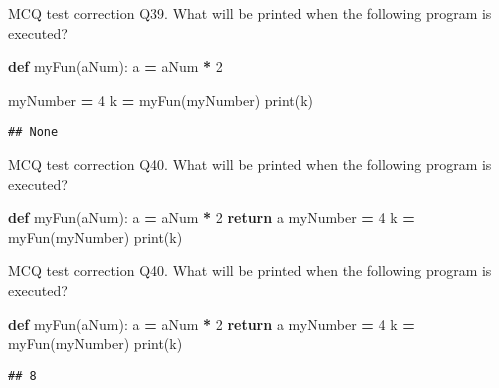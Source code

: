 \documentclass[
  8pt,
  ignorenonframetext,
]{beamer}
\newenvironment{Shaded}{\begin{snugshade}}{\end{snugshade}}
\newcommand{\BuiltInTok}[1]{#1}
\newcommand{\ControlFlowTok}[1]{\textcolor[rgb]{0.13,0.29,0.53}{\textbf{#1}}}
\newcommand{\DecValTok}[1]{\textcolor[rgb]{0.00,0.00,0.81}{#1}}
\newcommand{\KeywordTok}[1]{\textcolor[rgb]{0.13,0.29,0.53}{\textbf{#1}}}
\newcommand{\NormalTok}[1]{#1}
\newcommand{\OperatorTok}[1]{\textcolor[rgb]{0.81,0.36,0.00}{\textbf{#1}}}
\begin{document}
\begin{frame}[fragile]{MCQ test correction}
\protect\hypertarget{mcq-test-correction-77}{}
Q39. What will be printed when the following program is executed?

\begin{Shaded}
\begin{Highlighting}[]
\KeywordTok{def}\NormalTok{ myFun(aNum):}
\NormalTok{    a }\OperatorTok{=}\NormalTok{ aNum }\OperatorTok{*} \DecValTok{2}

\NormalTok{myNumber }\OperatorTok{=} \DecValTok{4}
\NormalTok{k }\OperatorTok{=}\NormalTok{ myFun(myNumber)}
\BuiltInTok{print}\NormalTok{(k)}
\end{Highlighting}
\end{Shaded}

\begin{verbatim}
## None
\end{verbatim}
\end{frame}

\begin{frame}[fragile]{MCQ test correction}
\protect\hypertarget{mcq-test-correction-78}{}
Q40. What will be printed when the following program is executed?

\begin{Shaded}
\begin{Highlighting}[]
\KeywordTok{def}\NormalTok{ myFun(aNum):}
\NormalTok{    a }\OperatorTok{=}\NormalTok{ aNum }\OperatorTok{*} \DecValTok{2}
    \ControlFlowTok{return}\NormalTok{ a}
\NormalTok{myNumber }\OperatorTok{=} \DecValTok{4}
\NormalTok{k }\OperatorTok{=}\NormalTok{ myFun(myNumber)}
\BuiltInTok{print}\NormalTok{(k)}
\end{Highlighting}
\end{Shaded}
\end{frame}

\begin{frame}[fragile]{MCQ test correction}
\protect\hypertarget{mcq-test-correction-79}{}
Q40. What will be printed when the following program is executed?

\begin{Shaded}
\begin{Highlighting}[]
\KeywordTok{def}\NormalTok{ myFun(aNum):}
\NormalTok{    a }\OperatorTok{=}\NormalTok{ aNum }\OperatorTok{*} \DecValTok{2}
    \ControlFlowTok{return}\NormalTok{ a}
\NormalTok{myNumber }\OperatorTok{=} \DecValTok{4}
\NormalTok{k }\OperatorTok{=}\NormalTok{ myFun(myNumber)}
\BuiltInTok{print}\NormalTok{(k)}
\end{Highlighting}
\end{Shaded}

\begin{verbatim}
## 8
\end{verbatim}
\end{frame}
\end{document}
